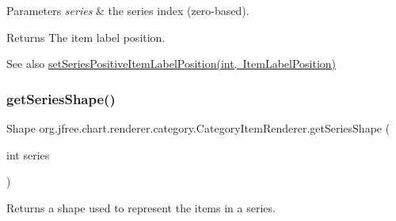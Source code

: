 \begin{DoxyParams}{Parameters}
{\em series} & the series index (zero-\/based).\\
\hline
\end{DoxyParams}
\begin{DoxyReturn}{Returns}
The item label position.
\end{DoxyReturn}
\begin{DoxySeeAlso}{See also}
\mbox{\hyperlink{interfaceorg_1_1jfree_1_1chart_1_1renderer_1_1category_1_1_category_item_renderer_aa18ccd691341104faff52214b09a288e}{set\+Series\+Positive\+Item\+Label\+Position(int, Item\+Label\+Position)}} 
\end{DoxySeeAlso}
\mbox{\label{interfaceorg_1_1jfree_1_1chart_1_1renderer_1_1category_1_1_category_item_renderer_a96f427b0799a82075fd19cc7be37de45}} 
\subsubsection{\texorpdfstring{get\+Series\+Shape()}{getSeriesShape()}}
{\footnotesize\ttfamily Shape org.\+jfree.\+chart.\+renderer.\+category.\+Category\+Item\+Renderer.\+get\+Series\+Shape (\begin{DoxyParamCaption}\item[{int}]{series }\end{DoxyParamCaption})}

Returns a shape used to represent the items in a series.


